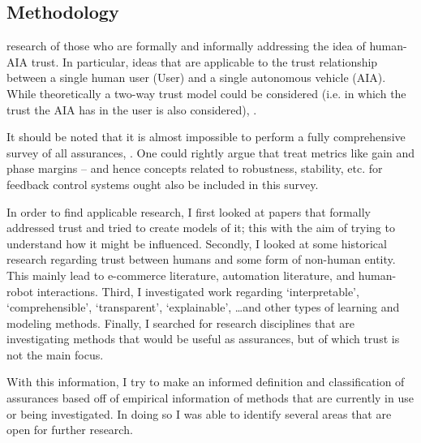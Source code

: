 \subsection{Methodology} \label{sec:methodology}
     research of those who are formally and informally addressing the idea of human-AIA trust. In particular,  ideas that are applicable to the trust relationship between a single human user (User) and a single autonomous vehicle (AIA). While theoretically a two-way trust model could be considered (i.e. in which the trust the AIA has in the user is also considered), . 

    It should be noted that it is almost impossible to perform a fully comprehensive survey of all  assurances, . One could rightly argue that  treat metrics like gain and phase margins  -- and hence concepts related to robustness, stability, etc. for feedback control systems ought also be included in this survey.  

    In order to find applicable research, I first looked at papers that formally addressed trust and tried to create models of it; this with the aim of trying to understand how it might be influenced. Secondly, I looked at some historical research regarding trust between humans and some form of non-human entity. This mainly lead to e-commerce literature, automation literature, and human-robot interactions. Third, I investigated work regarding `interpretable', `comprehensible', `transparent', `explainable', \ldots and other types of learning and modeling methods. Finally, I searched for research disciplines that are investigating methods that would be useful as assurances, but of which trust is not the main focus.

    With this information, I try to make an informed definition and classification of assurances based off of empirical information of methods that are currently in use or being investigated. In doing so I was able to identify several areas that are open for further research. 
